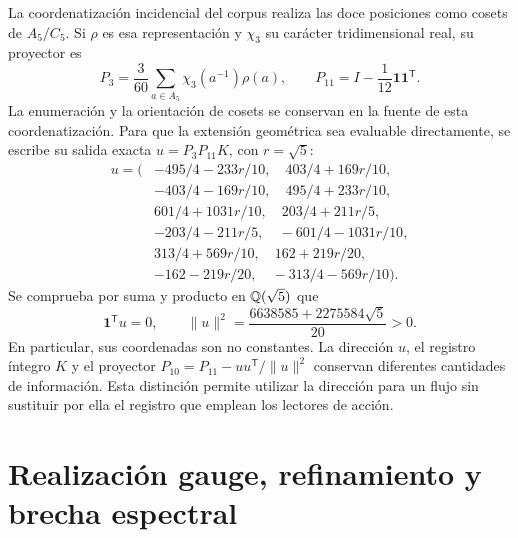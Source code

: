 \documentclass[a4paper,10pt]{article}
\theoremstyle{definition}\newtheorem{definition}[theorem]{Definición}
\theoremstyle{remark}\newtheorem{remark}[theorem]{Observación}
\numberwithin{equation}{section}
\begin{document}
La coordenatización incidencial del corpus realiza las doce posiciones como cosets
de \(A_5/C_5\). Si \(\rho\) es esa representación y \(\chi_3\) su
carácter tridimensional real, su proyector es
\[
 P_3=\frac3{60}\sum_{a\in A_5}\chi_3(a^{-1})\rho(a),\qquad
 P_{11}=I-\frac1{12}\mathbf1\mathbf1^{\mathsf T}.
\]
La enumeración y la orientación de cosets se conservan en la fuente de
esta coordenatización. Para que la extensión geométrica sea evaluable directamente,
se escribe su salida exacta \(u=P_3P_{11}K\), con \(r=\sqrt5\):
\begin{equation}
\begin{split}
u=\bigl(&-495/4-233r/10,\quad403/4+169r/10,\\
&-403/4-169r/10,\quad495/4+233r/10,\\
&601/4+1031r/10,\quad203/4+211r/5,\\
&-203/4-211r/5,\quad-601/4-1031r/10,\\
&313/4+569r/10,\quad162+219r/20,\\
&-162-219r/20,\quad-313/4-569r/10\bigr).
\end{split}
\label{eq:u-main}
\end{equation}
Se comprueba por suma y producto en \(\mathbb Q(\sqrt5)\) que
\[
 \mathbf1^{\mathsf T}u=0,\qquad
 \|u\|^2=\frac{6638585+2275584\sqrt5}{20}>0.
\]
En particular, sus coordenadas son no constantes. La dirección \(u\),
el registro íntegro \(K\) y el proyector
\(P_{10}=P_{11}-uu^{\mathsf T}/\|u\|^2\) conservan diferentes cantidades
de información. Esta distinción permite utilizar la dirección para un
flujo sin sustituir por ella el registro que emplean los lectores de acción.




















\clearpage
\part{Realización gauge, refinamiento y brecha espectral}






\end{document}

